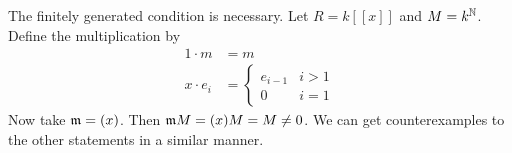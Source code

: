 \begin{rmk}
	The finitely generated condition is necessary.
	Let $R=k[[x]]$ and $M=k^{\mathbb{N}}$.
	Define the multiplication by
	\begin{align*}
		1 \cdot m &= m \\
		x \cdot e_i &=
			\begin{cases}
				e_{i-1} & i>1 \\
				0 & i=1
			\end{cases}
	\end{align*}
	Now take $\mathfrak{m} = (x)$.
	Then $\mathfrak{m} M = (x)M = M \neq 0$.
	We can get counterexamples to the other statements in a similar manner.
\end{rmk}
